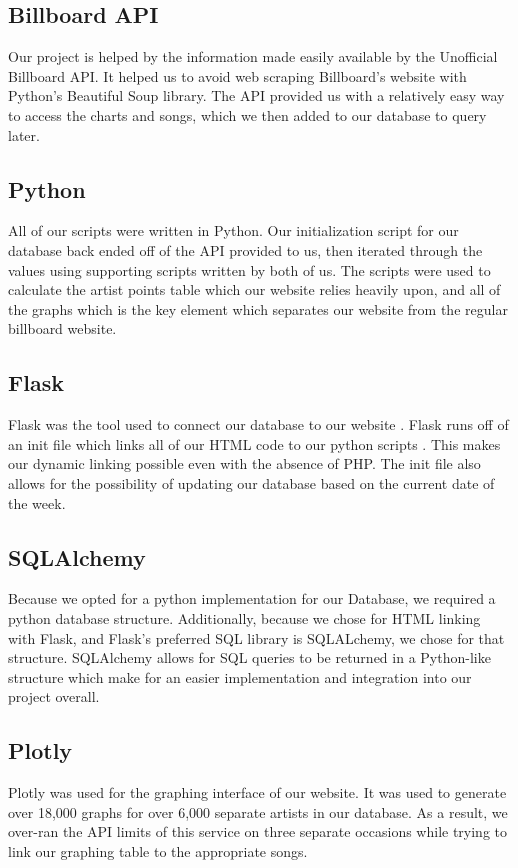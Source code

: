 \documentclass{article}
\begin{document}
\subsection*{Billboard API}
Our project is helped by the information made easily available by the Unofficial Billboard API. 
It helped us to avoid web scraping Billboard's website with Python's Beautiful Soup library. 
The API provided us with a relatively easy way to access the charts and songs, which we then added to our database to query later. 
\subsection*{Python}
All of our scripts were written in Python. 
Our initialization script for our database back ended off of the API provided to us, then iterated through the values using supporting scripts written by both of us. 
The scripts were used to calculate the artist points table which our website relies heavily upon, and all of the graphs which is the key element which separates our website from the regular billboard website.
\subsection*{Flask}
Flask was the tool used to connect our database to our website .
Flask runs off of an init file which links all of our HTML code to our python scripts .
This makes our dynamic linking possible even with the absence of PHP.
The init file also allows for the possibility of updating our database based on the current date of the week.
\subsection*{SQLAlchemy}
Because we opted for a python implementation for our Database, we required a python database structure.
Additionally, because we chose for HTML linking with Flask, and Flask's preferred SQL library is SQLALchemy, we chose for that structure.
SQLAlchemy allows for SQL queries to be returned in a Python-like structure which make for an easier implementation and integration into our project overall.
\subsection*{Plotly}
Plotly was used for the graphing interface of our website.
It was used to generate over 18,000 graphs for over 6,000 separate artists in our database.
As a result, we over-ran the API limits of this service on three separate occasions while trying to link our graphing table to the appropriate songs.
\end{document}
